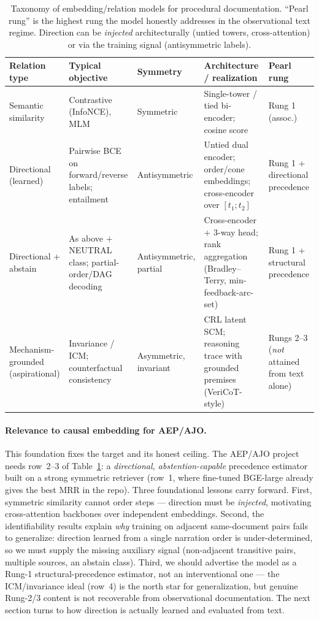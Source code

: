 \begin{table}[t]
\centering
\footnotesize
\caption{Taxonomy of embedding/relation models for procedural documentation.
``Pearl rung'' is the highest rung the model honestly addresses in the
observational text regime. Direction can be \emph{injected} architecturally
(untied towers, cross-attention) or via the training signal (antisymmetric
labels).}
\label{tab:found-taxonomy}
\begin{tabular}{@{}p{2.6cm}p{3.0cm}p{2.2cm}p{4.6cm}p{2.4cm}@{}}
\toprule
\textbf{Relation type} & \textbf{Typical objective} & \textbf{Symmetry} &
\textbf{Architecture / realization} & \textbf{Pearl rung} \\
\midrule
Semantic similarity & Contrastive (InfoNCE), MLM & Symmetric &
Single-tower / tied bi-encoder; cosine score & Rung 1 (assoc.) \\
\addlinespace
Directional (learned) & Pairwise BCE on forward/reverse labels; entailment &
Antisymmetric & Untied dual encoder; order/cone embeddings; cross-encoder over
$[t_1;t_2]$ & Rung 1 + directional precedence \\
\addlinespace
Directional + abstain & As above $+$ NEUTRAL class; partial-order/DAG decoding &
Antisymmetric, partial & Cross-encoder $+$ 3-way head; rank aggregation
(Bradley--Terry, min-feedback-arc-set) & Rung 1 + structural precedence \\
\addlinespace
Mechanism-grounded (aspirational) & Invariance / ICM; counterfactual
consistency & Asymmetric, invariant & CRL latent SCM; reasoning trace with
grounded premises (VeriCoT-style) & Rungs 2--3 (\emph{not} attained from text
alone) \\
\bottomrule
\end{tabular}
\end{table}

\paragraph{Relevance to causal embedding for AEP/AJO.}
This foundation fixes the target and its honest ceiling. The AEP/AJO project
needs row~2--3 of Table~\ref{tab:found-taxonomy}: a \emph{directional,
abstention-capable} precedence estimator built on a strong symmetric retriever
(row~1, where fine-tuned BGE-large already gives the best MRR in the repo). Three
foundational lessons carry forward. First, symmetric similarity cannot order
steps --- direction must be \emph{injected}, motivating cross-attention
backbones over independent embeddings. Second, the identifiability results
\citep{found:locatello2019challenging,found:scholkopf2021causalrl} explain
\emph{why} training on adjacent same-document pairs fails to generalize:
direction learned from a single narration order is under-determined, so we must
supply the missing auxiliary signal (non-adjacent transitive pairs, multiple
sources, an abstain class). Third, we should advertise the model as a Rung-1
structural-precedence estimator, not an interventional one --- the ICM/invariance
ideal (row~4) is the north star for generalization, but genuine Rung-2/3 content
is not recoverable from observational documentation. The next section turns to
how direction is actually learned and evaluated from text.
